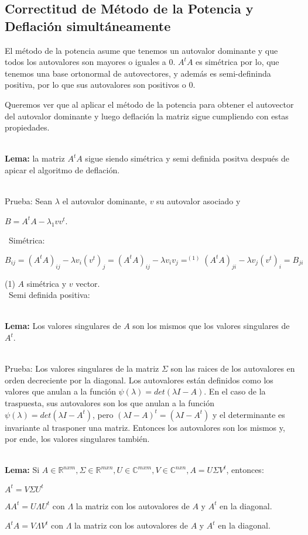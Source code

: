 \subsection{Correctitud de Método de la Potencia y Deflación simultáneamente}
El método de la potencia asume que tenemos un autovalor dominante y que todos los autovalores son
mayores o iguales a 0. $A^t A$ es simétrica por lo, que tenemos una base ortonormal de autovectores,
y además es semi-defininda positiva, por lo que sus autovalores son positivos o 0.

Queremos ver que al aplicar el método de la potencia para obtener el autovector del autovalor
dominante y luego deflación la matriz sigue cumpliendo con estas propiedades.

\ \\
\textbf{Lema:} la matriz $A^t A$ sigue siendo simétrica y semi definida positva después de apicar el
algoritmo de deflación.

\ \\
Prueba: Sean $\lambda$ el autovalor dominante, $v$ su autovalor asociado y

$B = A^t A - \lambda_{1} v v^t$.

\ Simétrica:


\begin{center}
  $B_{ij} = (A^t A)_{ij} - \lambda v_i (v^t)_j = (A^t A)_{ij} - \lambda v_i v_j =^{(1)} (A^t A)_{ji}
  - \lambda v_j (v^t)_i = B_{ji}$
\end{center}

(1) $A$ simétrica y $v$ vector.
\ \\

\ Semi definida positiva:

\ \\
\textbf{Lema:} Los valores singulares de $A$ son los mismos que los valores singulares de $A^t$.

\ \\
Prueba: Los valores singulares de la matriz $\Sigma$ son las raices de los autovalores en orden
decreciente por la diagonal. Los autovalores están definidos como los valores que anulan a la
función
$\psi(\lambda) = det(\lambda I - A)$. En el caso de la traspuesta, sus autovalores son los que
anulan a la función $\psi(\lambda) = det(\lambda I - A^t)$, pero $(\lambda I - A)^t = (\lambda I -
A^t)$ y el determinante es invariante al trasponer una matriz. Entonces los autovalores son los
mismos y, por ende, los valores singulares también.


\ \\
\textbf{Lema:} Si $A \in \mathbb{R}^{nxm},\Sigma \in \mathbb{R}^{mxn}, U \in \mathbb{C}^{mxm}, V \in
\mathbb{C}^{nxn}, A = U \Sigma V^t$, entonces:
\begin{compactitem}
  \item $A^t = V \Sigma U^t $
  \item $A A^t = U \Lambda U^t $ con $\Lambda$ la matriz con los autovalores de $A$ y $A^t$ en
    la diagonal.
  \item $A^t A = V \Lambda V^t $ con $\Lambda$ la matriz con los autovalores de $A$ y $A^t$ en
    la diagonal.
\end{compactitem}

